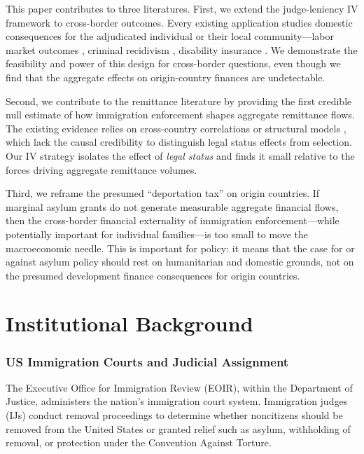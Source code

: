 \documentclass[12pt]{article}
\begin{document}
This paper contributes to three literatures. First, we extend the judge-leniency IV framework \citep{Kling2006, DobbieGoldinYang2018} to cross-border outcomes. Every existing application studies domestic consequences for the adjudicated individual or their local community---labor market outcomes \citep{Mueller-Smith2015}, criminal recidivism \citep{Aizer2015}, disability insurance \citep{Maestas2013, French2023}. We demonstrate the feasibility and power of this design for cross-border questions, even though we find that the aggregate effects on origin-country finances are undetectable.

Second, we contribute to the remittance literature by providing the first credible null estimate of how immigration enforcement shapes aggregate remittance flows. The existing evidence relies on cross-country correlations \citep{Adams2011, Clemens2014} or structural models \citep{Yang2008}, which lack the causal credibility to distinguish legal status effects from selection. Our IV strategy isolates the effect of \emph{legal status} and finds it small relative to the forces driving aggregate remittance volumes.

Third, we reframe the presumed ``deportation tax'' on origin countries. If marginal asylum grants do not generate measurable aggregate financial flows, then the cross-border financial externality of immigration enforcement---while potentially important for individual families---is too small to move the macroeconomic needle. This is important for policy: it means that the case for or against asylum policy should rest on humanitarian and domestic grounds, not on the presumed development finance consequences for origin countries.

\section{Institutional Background}

\subsubsection*{US Immigration Courts and Judicial Assignment} The Executive Office for Immigration Review (EOIR), within the Department of Justice, administers the nation's immigration court system. Immigration judges (IJs) conduct removal proceedings to determine whether noncitizens should be removed from the United States or granted relief such as asylum, withholding of removal, or protection under the Convention Against Torture.
\end{document}
